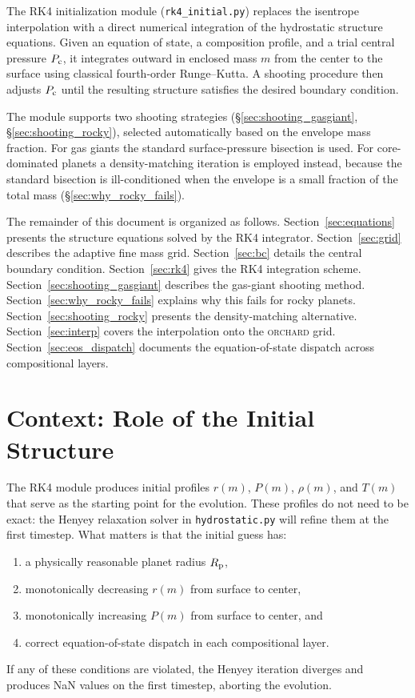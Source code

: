 \documentclass{aastex631}
\newcommand{\Rpl}{R_{\rm p}}
\newcommand{\Pc}{P_{\rm c}}
\newcommand{\orchard}{\textsc{orchard}}
\begin{document}
The RK4 initialization module (\texttt{rk4\_initial.py}) replaces the
isentrope interpolation with a direct numerical integration of the
hydrostatic structure equations.  Given an equation of state, a
composition profile, and a trial central pressure $\Pc$, it integrates
outward in enclosed mass $m$ from the center to the surface using
classical fourth-order Runge--Kutta.  A shooting procedure then adjusts
$\Pc$ until the resulting structure satisfies the desired boundary
condition.

The module supports two shooting strategies
(\S\ref{sec:shooting_gasgiant}, \S\ref{sec:shooting_rocky}), selected
automatically based on the envelope mass fraction.  For gas giants the
standard surface-pressure bisection is used.  For core-dominated planets
a density-matching iteration is employed instead, because the standard
bisection is ill-conditioned when the envelope is a small fraction of
the total mass (\S\ref{sec:why_rocky_fails}).

The remainder of this document is organized as follows.
Section~\ref{sec:equations} presents the structure equations solved by
the RK4 integrator.  Section~\ref{sec:grid} describes the adaptive fine
mass grid.  Section~\ref{sec:bc} details the central boundary condition.
Section~\ref{sec:rk4} gives the RK4 integration scheme.
Section~\ref{sec:shooting_gasgiant} describes the gas-giant shooting
method.  Section~\ref{sec:why_rocky_fails} explains why this fails for
rocky planets.  Section~\ref{sec:shooting_rocky} presents the
density-matching alternative.  Section~\ref{sec:interp} covers the
interpolation onto the \orchard{} grid.  Section~\ref{sec:eos_dispatch}
documents the equation-of-state dispatch across compositional layers.

\section{Context: Role of the Initial Structure}\label{sec:hse_context}

The RK4 module produces initial profiles $r(m)$, $P(m)$, $\rho(m)$,
and $T(m)$ that serve as the starting point for the evolution.  These
profiles do not need to be exact: the Henyey relaxation solver in
\texttt{hydrostatic.py} will refine them at the first timestep.  What
matters is that the initial guess has:
\begin{enumerate}
  \item a physically reasonable planet radius $\Rpl$,
  \item monotonically decreasing $r(m)$ from surface to center,
  \item monotonically increasing $P(m)$ from surface to center, and
  \item correct equation-of-state dispatch in each compositional layer.
\end{enumerate}
If any of these conditions are violated, the Henyey iteration
diverges and produces NaN values on the first timestep, aborting the
evolution.
\end{document}

